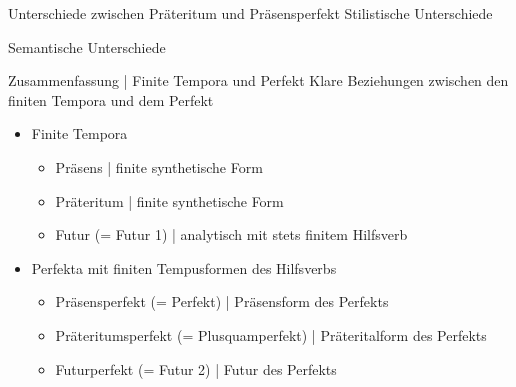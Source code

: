 \begin{frame}
  {Unterschiede zwischen Präteritum und Präsensperfekt}
  Stilistische Unterschiede\\
  \Halbzeile
  \begin{exe}
  \ex\label{ex:analytischetempora226}
  \begin{xlist}
  \end{xlist}
  \end{exe}
  \Zeile
  Semantische Unterschiede\\
  \Halbzeile
  \begin{exe}
  \ex\label{ex:analytischetempora229}
  \begin{xlist}
  \end{xlist}
  \end{exe}
\end{frame}

\begin{frame}
  {Zusammenfassung | Finite Tempora und Perfekt}
  \onslide<+->
  \onslide<+->
  Klare Beziehungen zwischen den finiten Tempora und dem Perfekt\\
  \Zeile
  \begin{itemize}[<+->]
    \item Finite Tempora
      \begin{itemize}[<+->]
        \item Präsens | finite synthetische Form
        \item Präteritum | finite synthetische Form
        \item Futur (= Futur 1) | analytisch mit stets finitem Hilfsverb
      \end{itemize}
     \Zeile 
    \item \alert{Perfekta mit finiten Tempusformen des Hilfsverbs}
      \begin{itemize}[<+->]
        \item Präsensperfekt (= Perfekt) | Präsensform des Perfekts
        \item Präteritumsperfekt (= Plusquamperfekt) | Präteritalform des Perfekts
        \item Futurperfekt (= Futur 2) | Futur des Perfekts
      \end{itemize}
  \end{itemize}
\end{frame}


